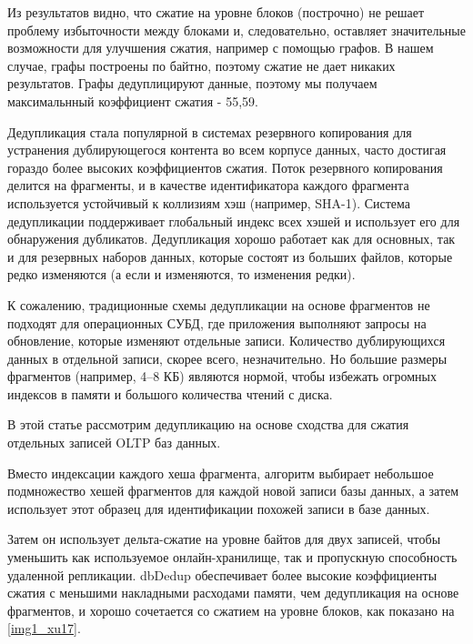 \documentclass[12pt,a4paper]{article}
\begin{document}
Из результатов видно, что сжатие на уровне блоков (построчно) не решает проблему избыточности между блоками и, следовательно, оставляет значительные возможности для улучшения сжатия, например с помощью графов. В нашем случае, графы построены по байтно, поэтому сжатие не дает никаких результатов. Графы дедуплицируют данные, поэтому мы получаем максимальнный коэффициент сжатия - 55,59.

Дедупликация стала популярной в системах резервного копирования для устранения дублирующегося контента во всем корпусе данных, часто достигая гораздо более высоких коэффициентов сжатия. Поток резервного копирования делится на фрагменты, и в качестве идентификатора каждого фрагмента используется устойчивый к коллизиям хэш (например, SHA-1). Система дедупликации поддерживает глобальный индекс всех хэшей и использует его для обнаружения дубликатов. Дедупликация хорошо работает как для основных, так и для резервных наборов данных, которые состоят из больших файлов, которые редко изменяются (а если и изменяются, то изменения редки).

К сожалению, традиционные схемы дедупликации на основе фрагментов не подходят
для операционных СУБД, где приложения выполняют запросы на обновление, которые изменяют отдельные записи. Количество дублирующихся данных в отдельной записи, скорее всего, незначительно. Но большие размеры фрагментов (например, 4–8 КБ) являются нормой, чтобы избежать огромных индексов в памяти и большого количества чтений с диска.

В этой статье рассмотрим дедупликацию на основе сходства \cite{Xu15} для
сжатия отдельных записей OLTP баз данных.

Вместо индексации каждого хеша фрагмента,
алгоритм выбирает небольшое подмножество хешей фрагментов для каждой новой записи базы данных, а затем использует этот образец для идентификации похожей записи в базе данных.

Затем он использует дельта-сжатие на уровне байтов для
двух записей, чтобы уменьшить как используемое онлайн-хранилище, так и пропускную способность удаленной репликации. dbDedup обеспечивает более высокие коэффициенты сжатия с меньшими накладными расходами памяти, чем дедупликация на основе фрагментов, и хорошо сочетается
со сжатием на уровне блоков, как показано на \ref{img1_xu17}. 
\end{document}
